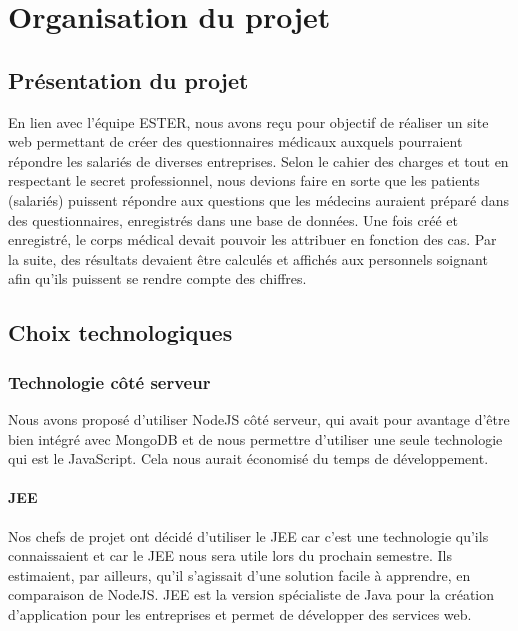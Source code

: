 \chapter{Organisation du projet}

\section{Présentation du projet}

En lien avec l'équipe ESTER, nous avons reçu pour objectif de réaliser un site web permettant de créer des questionnaires médicaux auxquels pourraient répondre les salariés de diverses entreprises. Selon le cahier des charges et tout en respectant le secret professionnel, nous devions faire en sorte que les patients (salariés) puissent répondre aux questions que les médecins auraient préparé dans des questionnaires, enregistrés dans une base de données. Une fois créé et enregistré, le corps médical devait pouvoir les attribuer en fonction des cas. Par la suite, des résultats devaient être calculés et affichés aux personnels soignant afin qu'ils puissent se rendre compte des chiffres. 

\section{Choix technologiques}

\subsection{Technologie côté serveur}

Nous avons proposé d'utiliser NodeJS côté serveur, qui avait pour avantage d'être bien intégré avec MongoDB
et de nous permettre d'utiliser une seule technologie qui est le JavaScript. Cela nous aurait économisé du 
temps de développement.

\subsubsection{JEE}

Nos chefs de projet ont décidé d'utiliser le JEE car c'est une technologie qu'ils connaissaient et car le 
JEE nous sera utile lors du prochain semestre. Ils estimaient, par ailleurs, qu'il s'agissait d'une solution facile à apprendre, en comparaison de NodeJS. 
JEE est la version spécialiste de Java pour la création 
d'application pour les entreprises et permet de développer des services web.


